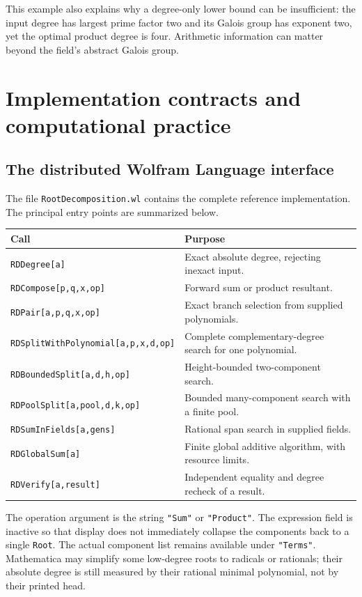 \documentclass[11pt,letterpaper]{article}
\theoremstyle{definition}
\newcommand{\code}[1]{\texttt{#1}}
\begin{document}
This example also explains why a degree-only lower bound can be insufficient: the input degree has largest prime factor two and its Galois group has exponent two, yet the optimal product degree is four. Arithmetic information can matter beyond the field's abstract Galois group.

\section{Implementation contracts and computational practice}
\subsection{The distributed Wolfram Language interface}
The file \code{RootDecomposition.wl} contains the complete reference implementation. The principal entry points are summarized below.
\begin{center}
\small
\begin{tabularx}{\textwidth}{@{}>{\raggedright\arraybackslash}p{}>{\raggedright\arraybackslash}X@{}}
\toprule
Call & Purpose \\
\midrule
\code{RDDegree[a]} & Exact absolute degree, rejecting inexact input. \\
\code{RDCompose[p,q,x,op]} & Forward sum or product resultant. \\
\code{RDPair[a,p,q,x,op]} & Exact branch selection from supplied polynomials. \\
\code{RDSplitWithPolynomial[a,p,x,d,op]} & Complete complementary-degree search for one polynomial. \\
\code{RDBoundedSplit[a,d,h,op]} & Height-bounded two-component search. \\
\code{RDPoolSplit[a,pool,d,k,op]} & Bounded many-component search with a finite pool. \\
\code{RDSumInFields[a,gens]} & Rational span search in supplied fields. \\
\code{RDGlobalSum[a]} & Finite global additive algorithm, with resource limits. \\
\code{RDVerify[a,result]} & Independent equality and degree recheck of a result. \\
\bottomrule
\end{tabularx}
\end{center}
The operation argument is the string \code{"Sum"} or \code{"Product"}. The expression field is inactive so that display does not immediately collapse the components back to a single \code{Root}. The actual component list remains available under \code{"Terms"}. Mathematica may simplify some low-degree roots to radicals or rationals; their absolute degree is still measured by their rational minimal polynomial, not by their printed head.
\end{document}
